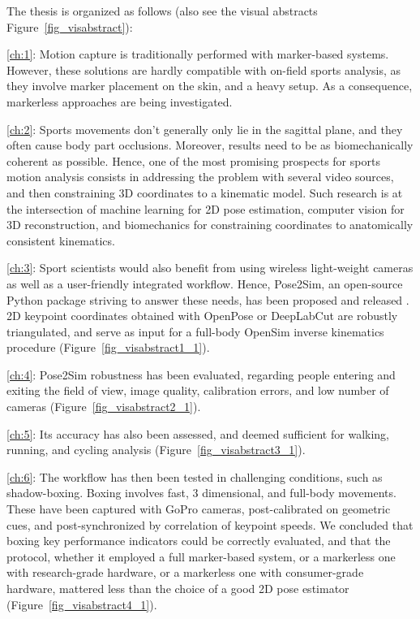 \newpage


The thesis is organized as follows (also see the visual abstracts Figure~\ref{fig_visabstract}):

\vspace*{0.2cm}
\noindent\autoref{ch:1}: Motion capture is traditionally performed with marker-based systems. However, these solutions are hardly compatible with on-field sports analysis, as they involve marker placement on the skin, and a heavy setup. As a consequence, markerless approaches are being investigated. 

\vspace*{0.2cm}
\noindent\autoref{ch:2}: Sports movements don’t generally only lie in the sagittal plane, and they often cause body part occlusions. Moreover, results need to be as biomechanically coherent as possible. Hence, one of the most promising prospects for sports motion analysis consists in addressing the problem with several video sources, and then constraining 3D coordinates to a kinematic model.  Such research is at the intersection of machine learning for 2D pose estimation, computer vision for 3D reconstruction, and biomechanics for constraining coordinates to anatomically consistent kinematics. 

\vspace*{0.2cm}
\noindent\autoref{ch:3}: Sport scientists would also benefit from using wireless light-weight cameras as well as a user-friendly integrated workflow. Hence, Pose2Sim, an open-source Python package striving to answer these needs, has been proposed and released \cite{Pagnon2022b}. 2D keypoint coordinates obtained with OpenPose or DeepLabCut are robustly triangulated, and serve as input for a full-body OpenSim inverse kinematics procedure (Figure~\ref{fig_visabstract1_1}).

\vspace*{0.2cm}
\noindent\autoref{ch:4}: Pose2Sim robustness has been evaluated, regarding people entering and exiting the field of view, image quality, calibration errors, and low number of cameras \cite{Pagnon2021} (Figure~\ref{fig_visabstract2_1}). 

\vspace*{0.2cm}
\noindent\autoref{ch:5}: Its accuracy has also been assessed, and deemed sufficient for walking, running, and cycling analysis \cite{Pagnon2022a} (Figure~\ref{fig_visabstract3_1}). 

\vspace*{0.2cm}
\noindent\autoref{ch:6}: The workflow has then been tested in challenging conditions, such as shadow-boxing. Boxing involves fast, 3 dimensional, and full-body movements. These have been captured with GoPro cameras, post-calibrated on geometric cues, and post-synchronized by correlation of keypoint speeds. We concluded that boxing key performance indicators could be correctly evaluated, and that the protocol, whether it employed a full marker-based system, or a markerless one with research-grade hardware, or a markerless one with consumer-grade hardware, mattered less than the choice of a good 2D pose estimator \cite{Pagnon2022c} (Figure~\ref{fig_visabstract4_1}).  

